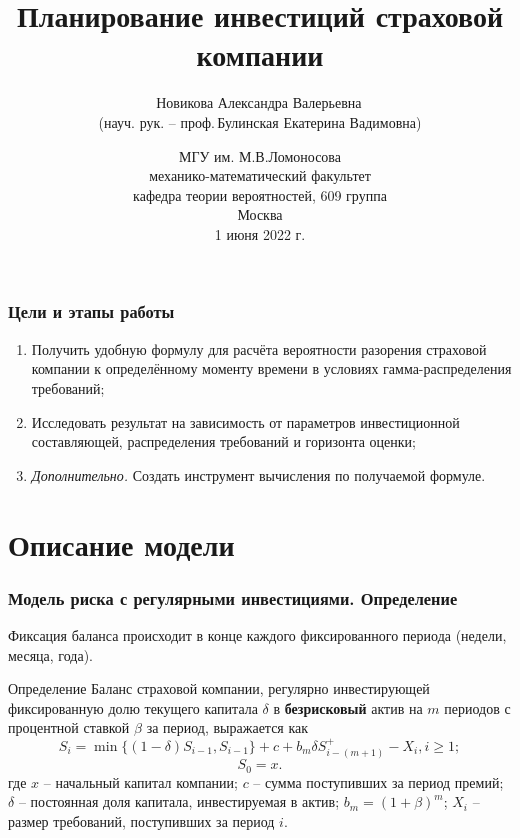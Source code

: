 \documentclass[10pt]{beamer}
\theoremstyle{definition}
\theoremstyle{remark}
\begin{document}
\title[Планирование инвестиций страховой компании]{\bf Планирование инвестиций страховой компании\\}
\author[Новикова А.В.]{Новикова Александра Валерьевна\, \\ \tiny{(науч. рук. -- проф.\,Булинская Екатерина Вадимовна)}}
\date{\small{МГУ им. М.В.Ломоносова\\механико-математический факультет\\ кафедра теории вероятностей, 609 группа\\}\vspace{0.5cm} 
\tiny{Москва\\1 июня 2022 г.}}

\begin{frame}
\titlepage
\end{frame}
\begin{frame}\frametitle{Цели и этапы работы}

\begin{enumerate}
\item{Получить удобную формулу для расчёта вероятности разорения страховой компании к определённому моменту времени в условиях гамма-распределения требований;}
\item{Исследовать результат на зависимость от параметров инвестиционной составляющей, распределения требований и горизонта оценки;}
\item{\textit{Дополнительно.} Создать инструмент вычисления по получаемой формуле.}
\end{enumerate}
\end{frame}

\section{Описание модели}
\begin{frame}\frametitle{Модель риска с регулярными инвестициями. Определение} 
	Фиксация баланса происходит в конце каждого фиксированного периода (недели, месяца, года). 
	\begin{block}{Определение}
		Баланс страховой компании, регулярно инвестирующей фиксированную долю текущего капитала $\delta$ в \textbf{безрисковый} актив на $m$ периодов с процентной ставкой $\beta$ за период, выражается как 
 	$$S_i=\min \lbrace (1-\delta)S_{i-1}, S_{i-1} \rbrace + c + b_m \delta S^{+}_{i-(m+1)} - X_i, i \geqslant 1;$$
 	$$S_0 = x.$$
 	где  $x$ -- начальный капитал компании;  $c$ -- сумма поступивших за период премий; $\delta$ -- постоянная доля капитала, инвестируемая в актив; $b_m = (1+\beta)^m$; $X_i$ -- размер требований, поступивших за период $i$. 
	\end{block} 
\end{frame}
\end{document}
